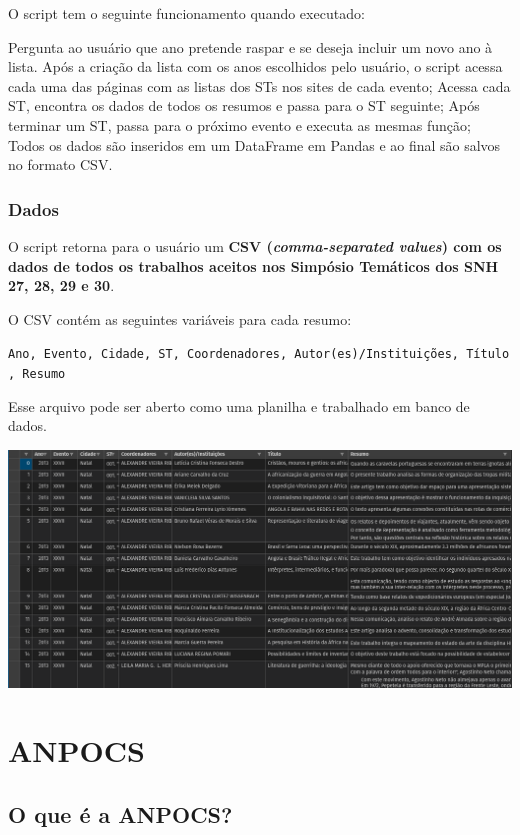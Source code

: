 \documentclass[
]{book}
\begin{document}
O script tem o seguinte funcionamento quando executado:

Pergunta ao usuário que ano pretende raspar e se deseja incluir um novo ano à lista.
Após a criação da lista com os anos escolhidos pelo usuário, o script acessa cada uma das páginas com as listas dos STs nos sites de cada evento;
Acessa cada ST, encontra os dados de todos os resumos e passa para o ST seguinte;
Após terminar um ST, passa para o próximo evento e executa as mesmas função;
Todos os dados são inseridos em um DataFrame em Pandas e ao final são salvos no formato CSV.

\hypertarget{dados-1}{%
\subsection{Dados}\label{dados-1}}

O script retorna para o usuário um \textbf{CSV (\emph{comma-separated values}) com os dados de todos os trabalhos aceitos nos Simpósio Temáticos dos SNH 27, 28, 29 e 30}.

O CSV contém as seguintes variáveis para cada resumo:

\texttt{Ano,\ Evento,\ Cidade,\ ST,\ Coordenadores,\ Autor(es)/Instituições,\ Título,\ Resumo}

Esse arquivo pode ser aberto como uma planilha e trabalhado em banco de dados.

\includegraphics{img/ex_csv2.png}

\hypertarget{anpocs}{%
\chapter{ANPOCS}\label{anpocs}}

\hypertarget{o-que-uxe9-a-anpocs}{%
\section{O que é a ANPOCS?}\label{o-que-uxe9-a-anpocs}}
\end{document}
